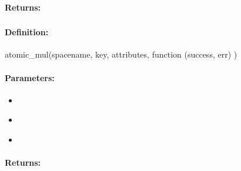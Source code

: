 \paragraph{Returns:}


\pagebreak
\subsubsection{}
\label{api:nodejs:atomic_mul}


\paragraph{Definition:}
\begin{javascriptcode}
atomic_mul(spacename, key, attributes, function (success, err) {})
\end{javascriptcode}
\paragraph{Parameters:}
\begin{itemize}[noitemsep]
\item {}\\

\item {}\\

\item {}\\

\end{itemize}

\paragraph{Returns:}


\pagebreak
\subsubsection{}
\label{api:nodejs:cond_atomic_mul}



